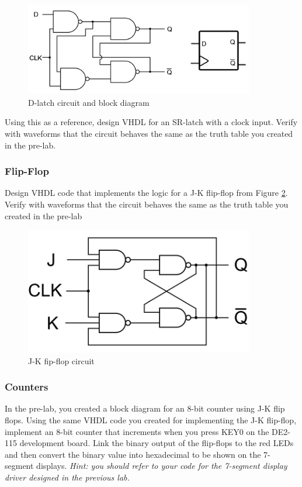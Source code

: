 \begin{figure}[H]
	\centering
	\includegraphics[width=100mm]{Lab2/figures/dlatch.png}
	\caption{D-latch circuit and block diagram}
	\label{fig:dlatch}
\end{figure}

Using this as a reference, design VHDL for an SR-latch with a clock input. Verify with waveforms that the circuit behaves the same as the truth table you created in the pre-lab.


\subsubsection{Flip-Flop}
Design VHDL code that implements the logic for a J-K flip-flop from Figure \ref{fig:jkflipflop}. Verify with waveforms that the circuit behaves the same as the truth table you created in the pre-lab 

\begin{figure}[H]
	\centering
	\includegraphics[width=100mm]{Lab2/figures/jkflipflop.png}
	\caption{J-K fip-flop circuit}
	\label{fig:jkflipflop}
\end{figure}

\subsubsection{Counters}
In the pre-lab, you created a block diagram for an 8-bit counter using J-K flip flops. Using the same VHDL code you created for implementing the J-K flip-flop, implement an 8-bit counter that increments when you press KEY0 on the DE2-115 development board. Link the binary output of the flip-flops to the red LEDs and then convert the binary value into hexadecimal to be shown on the 7-segment displays. \emph{Hint: you should refer to your code for the 7-segment display driver designed in the previous lab.}

